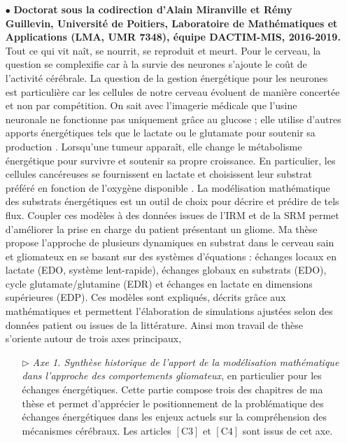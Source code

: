 \documentclass[a4paper, 12pt, twoside, openright]{article}
\begin{document}
\begin{itemize}
\newpage
\item[\color{MagSombre}$\bullet$] \textbf{\color{MagSombre}Doctorat sous la codirection d'Alain Miranville et Rémy Guillevin, Université de Poitiers, Laboratoire de Mathématiques et Applications (LMA, UMR 7348), équipe DACTIM-MIS, 2016-2019.}  Tout ce qui vit naît, se nourrit, se reproduit et meurt. Pour le cerveau, la question se complexifie car à la survie des neurones s'ajoute le coût de l'activité cérébrale. La question de la gestion énergétique pour les neurones est particulière car les cellules de notre cerveau évoluent de manière concertée et non par compétition. On sait avec l'imagerie médicale que l'usine neuronale ne fonctionne pas uniquement grâce au glucose ; elle utilise d'autres apports énergétiques tels que le lactate ou le glutamate pour soutenir sa production \cite{pellerin1994}. Lorsqu'une tumeur apparaît, elle change le métabolisme énergétique pour survivre et soutenir sa propre croissance. En particulier, les cellules cancéreuses se fournissent en lactate et choisissent leur substrat préféré en fonction de l'oxygène disponible \cite{romero2016, walenta2016}. La modélisation mathématique des substrats énergétiques est un outil de choix pour décrire et prédire de tels flux. Coupler ces modèles à des données issues de l'IRM et de la SRM permet d'améliorer la prise en charge du patient présentant un gliome. Ma thèse propose l'approche de plusieurs dynamiques en substrat dans le cerveau sain et gliomateux en se basant sur des systèmes d'équations : échanges locaux en lactate (EDO, système lent-rapide), échanges globaux en substrats (EDO), cycle glutamate/glutamine (EDR) et échanges en lactate en dimensions supérieures (EDP). Ces modèles sont expliqués, décrits grâce aux mathématiques et permettent l'élaboration de simulations ajustées selon des données patient ou issues de la littérature. Ainsi mon travail de thèse
s'oriente autour de trois axes principaux,
\begin{itemize}
\item[$\triangleright$]\textit{Axe 1. Synthèse historique de l'apport de la modélisation mathématique dans l'approche des comportements gliomateux}, en particulier pour les échanges énergétiques. Cette partie compose trois des chapitres de ma thèse et permet d'apprécier le positionnement de la problématique des échanges énergétiques dans les enjeux actuels sur la compréhension des mécanismes cérébraux. Les articles $\left[ \text{C3} \right]$ et $\left[ \text{C4} \right]$ sont issus de cet axe.

\end{itemize}
\end{itemize}
\end{document}
